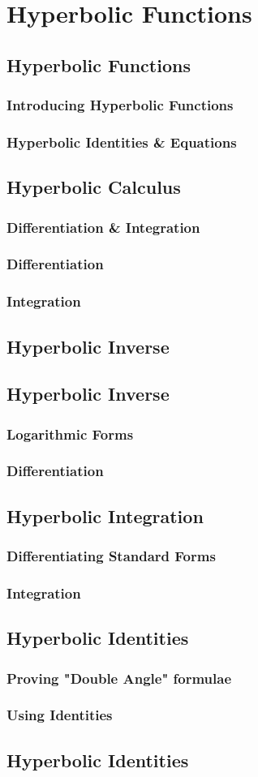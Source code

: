 \documentclass[../alevelmaths.tex]{subfiles}
\begin{document}
\chapter{Hyperbolic Functions}
\section{Hyperbolic Functions}
\subsection*{Introducing Hyperbolic Functions}
\subsection*{Hyperbolic Identities \& Equations}
\section{Hyperbolic Calculus}
\subsection*{Differentiation \& Integration}
\subsection*{Differentiation}
\subsection*{Integration}
\section{Hyperbolic Inverse}
\section{Hyperbolic Inverse}
\subsection*{Logarithmic Forms}
\subsection*{Differentiation}
\section{Hyperbolic Integration}
\subsection*{Differentiating Standard Forms}
\subsection*{Integration}
\section{Hyperbolic Identities}
\subsection*{Proving "Double Angle" formulae}
\subsection*{Using Identities}
\section{Hyperbolic Identities}
\end{document}
